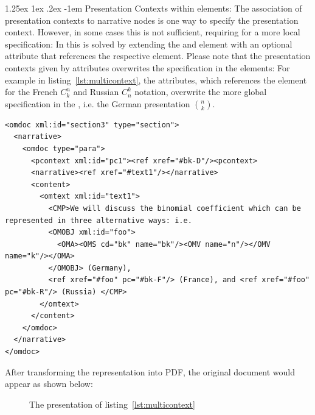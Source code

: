 \documentclass[pdftex,bibtotocnumbered,idxtotoc,11pt]{scrartcl}
\makeatletter
\renewcommand\paragraph{\@startsection{paragraph}{4}{\z@}%
{1.25ex \@plus1ex \@minus.2ex}%
{-1em}%
{\setlength{\parfillskip}{\z@ \@plus 1fil}%
\raggedsection\normalfont\sectfont\nobreak
\size@paragraph\nobreak}}
\makeatother
\begin{document}
\paragraph{Presentation Contexts within {\omdoc} elements:}
The association of presentation contexts to narrative nodes is one way to specify the
presentation context. However, in some cases this is not sufficient, requiring for a more
local specification: In {\omdoc} this is solved by extending the {} and
{} element with an optional attribute {} that references the
respective {} element. Please note that the presentation contexts
given by {} attributes overwrites the specification in the
{} elements: For example in listing~\ref{lst:multicontext}, the
{} attributes, which references the {} element for
the French $C_{k}^n$ and Russian $C_{n}^k$ notation, overwrite the more global
specification in the {}, i.e. the German presentation ${n \choose k}$.

\begin{lstlisting}[mathescape,caption={A Multi-context
Presentation},label=lst:multicontext]
<omdoc xml:id="section3" type="section">
  <narrative>
    <omdoc type="para">
      <pcontext xml:id="pc1"><ref xref="#bk-D"/><pcontext>
      <narrative><ref xref="#text1"/></narrative>
      <content>
        <omtext xml:id="text1">
          <CMP>We will discuss the binomial coefficient which can be represented in three alternative ways: i.e. 
          <OMOBJ xml:id="foo">
            <OMA><OMS cd="bk" name="bk"/><OMV name="n"/></OMV name="k"/></OMA>
          </OMOBJ> (Germany), 
          <ref xref="#foo" pc="#bk-F"/> (France), and <ref xref="#foo" pc="#bk-R"/> (Russia) </CMP>
        </omtext>
      </content>
    </omdoc>
  </narrative>
</omdoc>
\end{lstlisting}

After transforming the {\omdoc} representation into PDF, the original document would
appear as shown below:
\begin{figure}[ht]
\begin{center}
\caption{The presentation of listing~\ref{lst:multicontext}}
\end{center}
\end{figure}
\vspace*{-1.cm}
\end{document}
